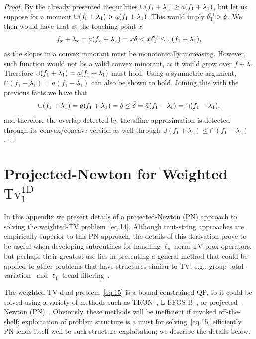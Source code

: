 \documentclass[twoside,11pt]{article}
\newcommand{\tvell}{\text{Tv}}
\newcommand{\oned}{\text{1D}}
\newcommand{\ubar}[1]{\underaccent{\bar}{#1}}
\numberwithin{equation}{section}
\numberwithin{theorem}{section}
\begin{document}
\begin{proof}
 By the already presented inequalities $\cup(f_1 + \lambda_1) \geq \ubar a(f_1 + \lambda_1)$, but let us suppose for a moment $\cup(f_1 + \lambda_1) > \ubar a(f_1 + \lambda_1)$. This would imply $\delta_1^{\cup} > \ubar \delta$. We then would have that at the touching point $x$
 \begin{align*}
  f_x + \lambda_x = \ubar a(f_x + \lambda_x) = x \ubar \delta < x \delta_1^{\cup} \leq \cup(f_1 + \lambda_1),
 \end{align*}
 as the slopes in a convex minorant must be monotonically increasing. However, such function would not be a valid convex minorant, as it would grow over $f+\lambda$. Therefore $\cup(f_1 + \lambda_1) = \ubar a(f_1 + \lambda_1)$ must hold. Using a symmetric argument, $\cap(f_1 - \lambda_1) = \bar a(f_1 - \lambda_1)$ can also be shown to hold. Joining this with the previous facts we have that
 \begin{align*}
  \cup(f_1 + \lambda_1) = \ubar a(f_1 + \lambda_1) = \ubar \delta \leq \bar \delta = \bar a(f_1 - \lambda_1) = \cap(f_1 - \lambda_1),
 \end{align*}
 and therefore the overlap detected by the affine approximation is detected through its convex/concave version as well through $\cup(f_1 + \lambda_1) \leq \cap(f_1 - \lambda_1)$.

\end{proof}

\section{Projected-Newton for Weighted $\tvell_1^{\oned}$}
\label{app:projNewton}

In this appendix we present details of a projected-Newton (PN) approach to solving the weighted-TV problem~\eqref{eq.14}. Although taut-string approaches are empirically superior to this PN approach, the details of this derivation prove to be useful when developing subroutines for handling $\ell_p$-norm TV prox-operators, but perhaps their greatest use lies in presenting a general method that could be applied to other problems that have structures similar to TV, e.g., group total-variation~\citep{alaiz2013group,wytock} and $\ell_1$-trend filtering~\citep{boyd.kim,trendf}.

The weighted-TV dual problem~\eqref{eq.15} is a bound-constrained QP, so it could be solved using a variety of methods such as TRON~\citep{TRON}, L-BFGS-B~\citep{L-BFGS-B}, or projected-Newton (PN)~\citep{ProjNewton}. Obviously, these methods will be inefficient if invoked off-the-shelf; exploitation of problem structure is a must for solving~\eqref{eq.15} efficiently. PN lends itself well to such structure exploitation; we describe the details below.
\end{document}
